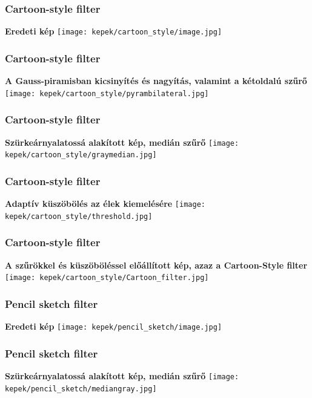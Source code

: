 \documentclass{beamer}
\begin{document}
\begin{frame}[fragile]
\frametitle{Cartoon-style filter}
\begin{center}
\textbf{Eredeti kép}
\texttt{[image: kepek/cartoon\_style/image.jpg]}
\end{center}
\end{frame}

\begin{frame}[fragile]
\frametitle{Cartoon-style filter}
\begin{center}
\textbf{A Gauss-piramisban kicsinyítés és nagyítás, valamint a kétoldalú szűrő}
\texttt{[image: kepek/cartoon\_style/pyrambilateral.jpg]}
\end{center}
\end{frame}

\begin{frame}[fragile]
\frametitle{Cartoon-style filter}
\begin{center}
\textbf{Szürkeárnyalatossá alakított kép, medián szűrő}
\texttt{[image: kepek/cartoon\_style/graymedian.jpg]}
\end{center}
\end{frame}

\begin{frame}[fragile]
\frametitle{Cartoon-style filter}
\begin{center}
\textbf{Adaptív küszöbölés az élek kiemelésére}
\texttt{[image: kepek/cartoon\_style/threshold.jpg]}
\end{center}
\end{frame}

\begin{frame}[fragile]
\frametitle{Cartoon-style filter}
\begin{center}
\textbf{A szűrökkel és küszöböléssel előállított kép, azaz a Cartoon-Style filter}
\texttt{[image: kepek/cartoon\_style/Cartoon\_filter.jpg]}
\end{center}
\end{frame}

\begin{frame}[fragile]
\frametitle{Pencil sketch filter}
\begin{center}
\textbf{Eredeti kép}
\texttt{[image: kepek/pencil\_sketch/image.jpg]}
\end{center}
\end{frame}

\begin{frame}[fragile]
\frametitle{Pencil sketch filter}
\begin{center}
\textbf{Szürkeárnyalatossá alakított kép, medián szűrő}
\texttt{[image: kepek/pencil\_sketch/mediangray.jpg]}
\end{center}
\end{frame}
\end{document}
